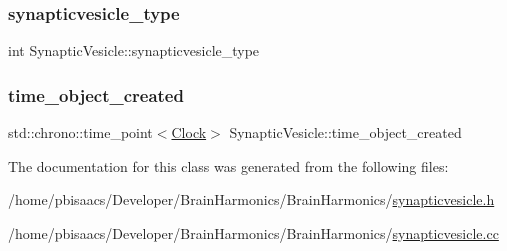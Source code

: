 \mbox{\label{classSynapticVesicle_a568770c79ad49a55129076a1bc625db2}} 
\subsubsection{\texorpdfstring{synapticvesicle\+\_\+type}{synapticvesicle\_type}}
{\footnotesize\ttfamily int Synaptic\+Vesicle\+::synapticvesicle\+\_\+type\hspace{0.3cm}{\ttfamily [private]}}

\mbox{\label{classSynapticVesicle_af025ff605f37a683bd4a00d9140a217b}} 
\subsubsection{\texorpdfstring{time\+\_\+object\+\_\+created}{time\_object\_created}}
{\footnotesize\ttfamily std\+::chrono\+::time\+\_\+point$<$\mbox{\hyperlink{universe_8h_a0ef8d951d1ca5ab3cfaf7ab4c7a6fd80}{Clock}}$>$ Synaptic\+Vesicle\+::time\+\_\+object\+\_\+created\hspace{0.3cm}{\ttfamily [private]}}



The documentation for this class was generated from the following files\+:\begin{DoxyCompactItemize}
\item 
/home/pbisaacs/\+Developer/\+Brain\+Harmonics/\+Brain\+Harmonics/\mbox{\hyperlink{synapticvesicle_8h}{synapticvesicle.\+h}}\item 
/home/pbisaacs/\+Developer/\+Brain\+Harmonics/\+Brain\+Harmonics/\mbox{\hyperlink{synapticvesicle_8cc}{synapticvesicle.\+cc}}\end{DoxyCompactItemize}
